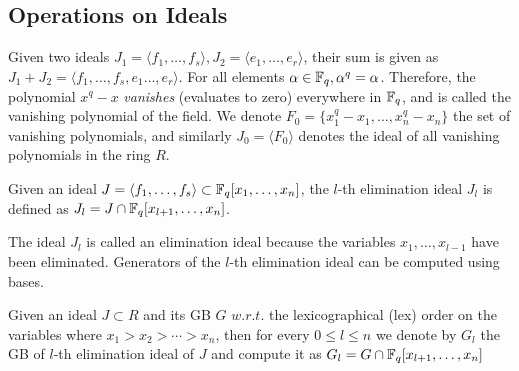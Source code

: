 \subsection{Operations on Ideals}
Given two ideals $J_1 = \langle f_1,\dots,f_s\rangle, J_2=\langle
e_1,\dots,e_r\rangle$, their sum is given as $J_1 + J_2 = \langle
f_1,\dots,f_s,e_1\dots,e_r\rangle$.
For all elements $\alpha \in {\mathbb{F}}_{q}, \alpha^q = \alpha$. Therefore, the
polynomial $x^q-x$ {\it vanishes} (evaluates to zero) everywhere in
${\mathbb{F}}_{q}$, and is called the vanishing polynomial of the field. We denote
$F_0 = \{x_1^q-x_1,\dots,x_n^q-x_n\}$ the set of vanishing
polynomials, and similarly $J_0 = \langle F_0 \rangle$
denotes the ideal of all vanishing polynomials in the ring $R$.

\begin{Definition}
Given an ideal $J = \langle f_1, \dots, f_s\rangle \subset {\mathbb{F}}_{q}[x_1,\dots,x_n]$, the $l$-th elimination
ideal $J_l$ is defined as $J_l = J \cap {\mathbb{F}}_{q}[x_{l+1},\dots,x_n]$.
\end{Definition}

The ideal $J_l$ is called an elimination ideal because the variables $x_1,\dots,x_{l-1}$
have been eliminated. Generators of the $l$-th elimination ideal can
be computed using \Grobner bases.

\begin{Theorem}
\label{def:elim}
Given an ideal $J \subset R$ and its GB $G$ $w.r.t.$ the
lexicographical (lex) order on the variables 
where $x_1 > x_2 > \cdots > x_n$, then for every $0 \leq l \leq n$ we
denote by $G_l$ the GB of $l$-th elimination ideal of $J$ and compute
it as $G_l = G \cap {\mathbb{F}}_{q}[x_{l+1},\dots,x_n]$
\end{Theorem}


